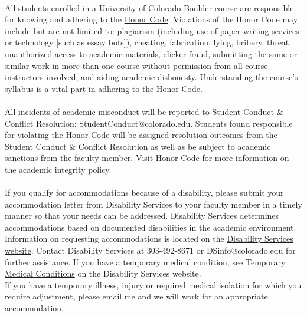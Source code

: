\documentclass[11pt]{article}
\begin{document}
\\
All students enrolled in a University of Colorado Boulder course are responsible for knowing and adhering to the \href{https://www.colorado.edu/sccr/media/229}{Honor Code}. Violations of the Honor Code may include but are not limited to: plagiarism (including use of paper writing services or technology [such as essay bots]), cheating, fabrication, lying, bribery, threat, unauthorized access to academic materials, clicker fraud, submitting the same or similar work in more than one course without permission from all course instructors involved, and aiding academic dishonesty. Understanding the course's syllabus is a vital part in adhering to the Honor Code.
\\
\\
All incidents of academic misconduct will be reported to Student Conduct & Conflict Resolution: StudentConduct@colorado.edu. Students found responsible for violating the \href{https://www.colorado.edu/sccr/media/229}{Honor Code} will be assigned resolution outcomes from the Student Conduct & Conflict Resolution as well as be subject to academic sanctions from the faculty member. Visit \href{https://www.colorado.edu/sccr/media/229}{Honor Code} for more information on the academic integrity policy. \\

\\
If you qualify for accommodations because of a disability, please submit your accommodation letter from Disability Services to your faculty member in a timely manner so that your needs can be addressed.  Disability Services determines accommodations based on documented disabilities in the academic environment.  Information on requesting accommodations is located on the \href{https://www.colorado.edu/disabilityservices/}{Disability Services website}. Contact Disability Services at 303-492-8671 or DSinfo@colorado.edu  for further assistance.  If you have a temporary medical condition, see \href{https://www.colorado.edu/disabilityservices/students/temporary-medical-conditions}{Temporary Medical Conditions} on the Disability Services website.\\
If you have a temporary illness, injury or required medical isolation for which you require adjustment, please email me and we will work for an appropriate accommodation.\\
\end{document}
